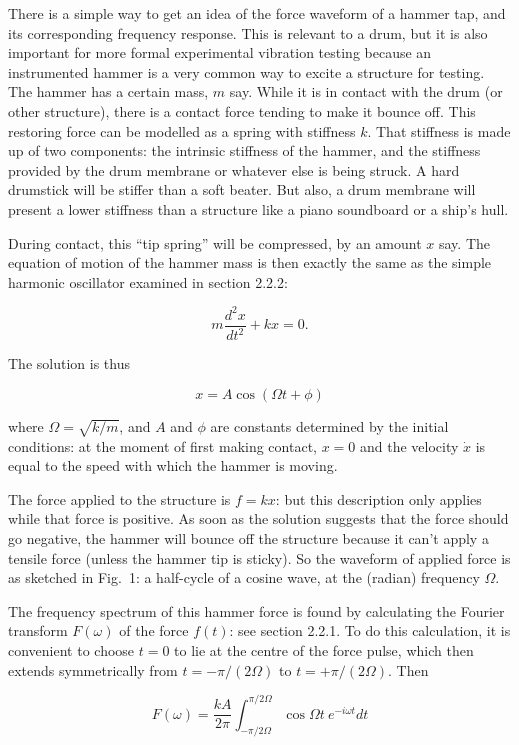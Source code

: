   There is a simple way to get an idea of the force waveform of a hammer tap, 
  and its corresponding frequency response. This is relevant to a drum, but it 
  is also important for more formal experimental vibration testing because an 
  instrumented hammer is a very common way to excite a structure for testing. 
  The hammer has a certain mass, $m$ say. While it is in contact with the drum 
  (or other structure), there is a contact force tending to make it bounce off. 
  This restoring force can be modelled as a spring with stiffness $k$. That 
  stiffness is made up of two components: the intrinsic stiffness of the 
  hammer, and the stiffness provided by the drum membrane or whatever else is 
  being struck. A hard drumstick will be stiffer than a soft beater. But also, 
  a drum membrane will present a lower stiffness than a structure like a piano 
  soundboard or a ship's hull. 

  During contact, this ``tip spring'' will be compressed, by an amount $x$ say. 
  The equation of motion of the hammer mass is then exactly the same as the 
  simple harmonic oscillator examined in section 2.2.2: 

  $$m \dfrac{d^2 x}{dt^2}+kx=0. \tag{1}$$ 

  The solution is thus 

  $$x=A \cos(\Omega t + \phi) \tag{2}$$ 

  where $\Omega=\sqrt{k/m}$, and $A$ and $\phi$ are constants determined by the 
  initial conditions: at the moment of first making contact, $x=0$ and the 
  velocity $\dot{x}$ is equal to the speed with which the hammer is moving. 

  The force applied to the structure is $f=kx$: but this description only 
  applies while that force is positive. As soon as the solution suggests that 
  the force should go negative, the hammer will bounce off the structure 
  because it can't apply a tensile force (unless the hammer tip is sticky). So 
  the waveform of applied force is as sketched in Fig.\ 1: a half-cycle of a 
  cosine wave, at the (radian) frequency $\Omega$. 

  The frequency spectrum of this hammer force is found by calculating the 
  Fourier transform $F(\omega)$ of the force $f(t)$: see section 2.2.1. To do 
  this calculation, it is convenient to choose $t=0$ to lie at the centre of 
  the force pulse, which then extends symmetrically from $t=-\pi / (2 \Omega)$ 
  to $t=+\pi / (2 \Omega)$. Then 

  $$F(\omega) = \dfrac{kA}{2 \pi} \int_{-\pi/2 \Omega}^{\pi/2 \Omega} \cos 
  \Omega t~e^{-i \omega t} dt \tag{3}$$ 

